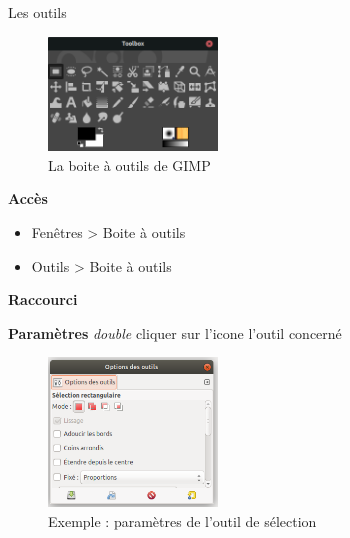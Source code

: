 \documentclass[10pt,svgnames,usenames,table]{beamer}
\begin{document}
\begin{frame}[allowframebreaks]{Les outils}
	
	\begin{figure}
        	\centering
        	\includegraphics[width=0.4\textwidth]{Images/gimp_toolbox}
        	\caption{La boite à outils de GIMP} 
    	\end{figure}
	
	\textbf{Accès}
	
	\begin{itemize}
		\item Fenêtres > Boite à outils
		\item Outils > Boite à outils
	\end{itemize}
	
	\vspace{0.2cm}
	\textbf{Raccourci} 
	
	\framebreak
	\textbf{Paramètres} \textit{double} cliquer sur l'icone l'outil concerné
	\begin{figure}
        	\centering
        	\includegraphics[width=0.4\textwidth]{Images/option_outil}
        	\caption{Exemple : paramètres de l'outil de sélection} 
    	\end{figure}

\end{frame}	
\end{document}
